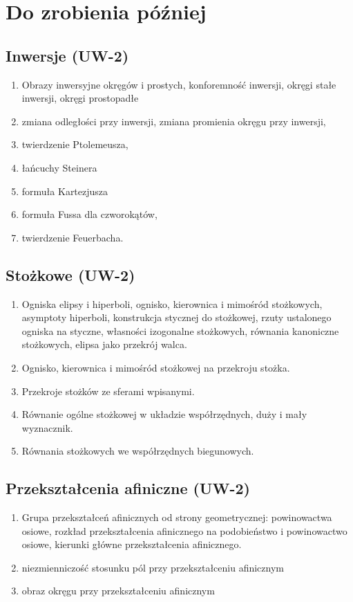
\section{Do zrobienia później}
\subsection{Inwersje (UW-2)}
\begin{enumerate}
	\item Obrazy inwersyjne okręgów i prostych, konforemność inwersji, okręgi stałe inwersji, okręgi prostopadłe
	\item zmiana odległości przy inwersji, zmiana promienia okręgu przy inwersji,
	\item twierdzenie Ptolemeusza,
	\item łańcuchy Steinera
	\item formuła Kartezjusza
	\item formuła Fussa dla czworokątów,
	\item twierdzenie Feuerbacha.
\end{enumerate}

\subsection{Stożkowe (UW-2)}
\begin{enumerate}
	\item Ogniska elipsy i hiperboli, ognisko, kierownica i mimośród stożkowych, asymptoty hiperboli, konstrukcja stycznej do stożkowej, rzuty ustalonego ogniska na styczne, własności izogonalne stożkowych, równania kanoniczne stożkowych, elipsa jako przekrój walca.
	\item Ognisko, kierownica i mimośród stożkowej na przekroju stożka.
	\item Przekroje stożków ze sferami wpisanymi.
	\item Równanie ogólne stożkowej w układzie współrzędnych, duży i mały wyznacznik.
	\item Równania stożkowych we współrzędnych biegunowych.
\end{enumerate}

\subsection{Przekształcenia afiniczne (UW-2)}
\begin{enumerate}
	\item Grupa przekształceń afinicznych od strony geometrycznej: powinowactwa osiowe, rozkład przekształcenia afinicznego na podobieństwo i powinowactwo osiowe, kierunki główne przekształcenia afinicznego.
	\item niezmienniczość stosunku pól przy przekształceniu afinicznym
	\item obraz okręgu przy przekształceniu afinicznym
\end{enumerate}

